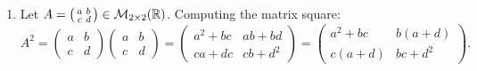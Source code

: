 \begin{exercisesolution}
\label{sol:matrix_powers_2x2}
\begin{enumerate}[label=\textbf{(\alph*)}]
    \item Let $A = \left(\begin{smallmatrix} a & b \\ c & d \end{smallmatrix}\right) \in \mathcal{M}_{2 \times 2}(\mathbb{R})$.
    Computing the matrix square:
    \[
    A^2 = \begin{pmatrix} a & b \\ c & d \end{pmatrix} \begin{pmatrix} a & b \\ c & d \end{pmatrix} = \begin{pmatrix} a^2 + bc & ab + bd \\ ca + dc & cb + d^2 \end{pmatrix} = \begin{pmatrix} a^2 + bc & b(a + d) \\ c(a + d) & bc + d^2 \end{pmatrix}.
    \]


\end{enumerate}
\end{exercisesolution}
